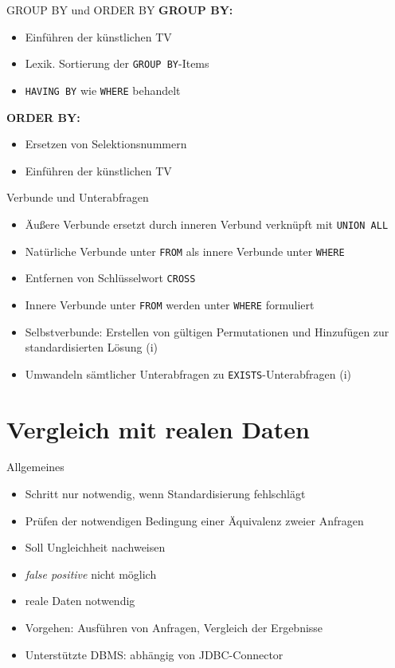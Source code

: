 \documentclass{beamer}
\begin{document}
\begin{frame}[fragile]{GROUP BY und ORDER BY}
\textbf{GROUP BY:}
\begin{itemize}
\item Einführen der künstlichen TV
\item Lexik. Sortierung der \verb|GROUP BY|-Items
\item \verb|HAVING BY| wie \verb|WHERE| behandelt
\end{itemize}
\textbf{ORDER BY:}
\begin{itemize}
\item Ersetzen von Selektionsnummern 
\item Einführen der künstlichen TV
\end{itemize}
\end{frame}

\begin{frame}[fragile]{Verbunde und Unterabfragen}
\begin{itemize}
\item Äußere Verbunde ersetzt durch inneren Verbund verknüpft mit \verb|UNION ALL|
\item Natürliche Verbunde unter \verb|FROM| als innere Verbunde unter \verb|WHERE|
\item Entfernen von Schlüsselwort \verb|CROSS|
\item Innere Verbunde unter \verb|FROM| werden unter \verb|WHERE| formuliert
\item Selbstverbunde: Erstellen von gültigen Permutationen und Hinzufügen zur standardisierten Lösung (i)
\item Umwandeln sämtlicher Unterabfragen zu \verb|EXISTS|-Unterabfragen (i)
\end{itemize}
\end{frame}

\section{Vergleich mit realen Daten}

\begin{frame}[fragile]{Allgemeines}
\begin{itemize}
\item Schritt nur notwendig, wenn Standardisierung fehlschlägt
\item Prüfen der notwendigen Bedingung einer Äquivalenz zweier Anfragen
\item Soll Ungleichheit nachweisen
\item \textit{false positive} nicht möglich
\item reale Daten notwendig
\item Vorgehen: Ausführen von Anfragen, Vergleich der Ergebnisse 
\item Unterstützte DBMS: abhängig von JDBC-Connector
\end{itemize}
\end{frame}
\end{document}

